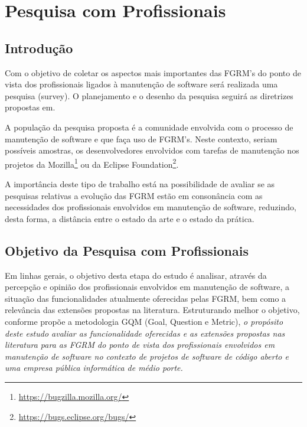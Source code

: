 \chapter{Pesquisa com Profissionais}
\label{ch:pesquisa-profissionais}

\section{Introdução}
\label{sec:pesquisa-profissionais-intro}


Com o objetivo de coletar os aspectos mais importantes das FGRM's do ponto de
vista dos profissionais ligados à manutenção de software será realizada uma
 pesquisa (survey). O planejamento e o desenho da pesquisa seguirá as diretrizes propostas em\cite{wohlin2012experimentation}.

A população da pesquisa proposta é a comunidade envolvida com o processo de
manutenção de software e que faça uso de FGRM's. Neste contexto, seriam
possíveis amostras, os desenvolvedores envolvidos com tarefas de manutenção nos
projetos da Mozilla\footnote{\url{https://bugzilla.mozilla.org/}} ou da
Eclipse Foundation\footnote{\url{https://bugs.eclipse.org/bugs/}}.

A importância deste tipo de trabalho está na possibilidade de avaliar se as pesquisas relativas a
evolução das FGRM estão em consonância com as necessidades dos profissionais envolvidos em
manutenção de software, reduzindo, desta forma, a distância entre o estado da arte e o estado da
prática.  

\section{Objetivo da Pesquisa com Profissionais}
\label{sec:objetivo_da_pesquisa_com_profissionais}
Em linhas gerais, o objetivo desta etapa do estudo é analisar, através da percepção e opinião dos
profissionais envolvidos em manutenção de software, a situação das funcionalidades atualmente
oferecidas pelas FGRM, bem como a relevância das extensões propostas na literatura. Estruturando
melhor o objetivo, conforme propõe a metodologia GQM (Goal, Question e Metric)\cite{gqm}, \textit{o propósito deste estudo avaliar as funcionalidade oferecidas e as extensões propostas nas literatura para as FGRM do ponto de vista dos profissionais envolvidos em manutenção de software no contexto de projetos de software de código aberto e uma empresa pública informática de médio porte.}  


